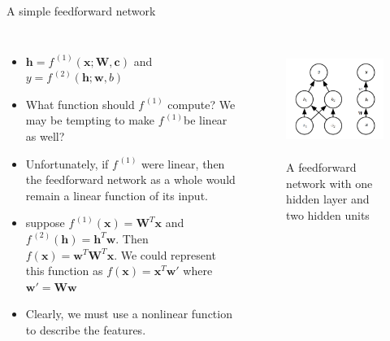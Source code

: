 \documentclass[10pt]{beamer}
\begin{document}
	\begin{frame}{A simple feedforward network}
		\begin{columns}[T]
			\begin{itemize}
				\item $\bm{h}=f^{\,(1)}(\bm{x};\bm{W},\bm{c})$ and $y=f^{\,(2)}(\bm{h};\bm{w},b)$
				\item What function should $f^{\,(1)}$ compute? We may be tempting to make $f^{\,(1)}$be linear as well?
				\item Unfortunately, if $f^{\,(1)}$ were linear, then the feedforward network as a whole would remain a linear function of its input.
				\item suppose $f^{\,(1)}(\bm{x})=\bm{W}^T\bm{x}$ and $f^{\,(2)}(\bm{h})=\bm{h}^T\bm{w}$. Then $f(\bm{x})=\bm{w}^T\bm{W}^T\bm{x}$. We could represent this function as $f(\bm{x})=\bm{x}^T\bm{w'}$ where $\bm{w'}=\bm{Ww}$
				\item Clearly, we must use a nonlinear function to describe the features.
			\end{itemize}
			
			\setcounter{figure}{\thefigure-1}
			\begin{figure}
				\caption{A feedforward network with one hidden layer and two hidden units}
				\includegraphics[height=10em]{figures/network-one-hidden-layer-two-hidden-unit.png}
			\end{figure}
		\end{columns}
	\end{frame}
\end{document}
